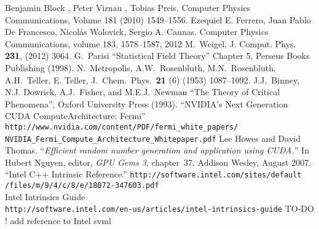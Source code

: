 \documentclass[a4paper]{llncs}
\begin{document}
\begin{thebibliography}{9}
Benjamin Block , Peter Virnau , Tobias Preis, Computer Physics Communications, Volume 181 (2010) 1549–1556.
Ezequiel E. Ferrero, Juan Pablo De Francesco, Nicolás Wolovick, Sergio A. Cannas. Computer Physics Communications, volume 183, 1578--1587, 2012
 M.~Weigel, J. Comput. Phys. \textbf{231},  (2012) 3064.
 G.~Parisi ``Statistical Field Theory'' Chapter 5, Perseus Books Publishing (1998).
N.~Metropolis, A.W.~Rosenbluth, M.N.~Rosenbluth, A.H.~Teller, E. Teller,
   J.~Chem.~Phys.~\textbf{21} (6) (1953) 1087--1092.
J.J.~Binney, N.J. Dowrick, A.J.~Fisher, and M.E.J.~Newman ``The Theory of Critical Phenomena'', Oxford University Press (1993).
``NVIDIA's Next Generation CUDA ComputeArchitecture: Fermi'' \\
\verb!http://www.nvidia.com/content/PDF/fermi_white_papers/!\\
\verb!NVIDIA_Fermi_Compute_Architecture_Whitepaper.pdf!
Lee Howes and David Thomas.
``{\em Efficient random number generation and application using {CUDA}.}''
In Hubert Nguyen, editor, {\em GPU Gems 3}, chapter~37. Addison
  Wesley, August 2007.
 ``Intel C++ Intrinsic Reference.'' 
\verb!http://software.intel.com/sites/default!\\\verb!/files/m/9/4/c/8/e/18072-347603.pdf! \\
Intel Intrinsics Guide\\ \verb!http://software.intel.com/en-us/articles/intel-intrinsics-guide!
 TO-DO ! add reference to Intel svml
\end{thebibliography}
\end{document}
